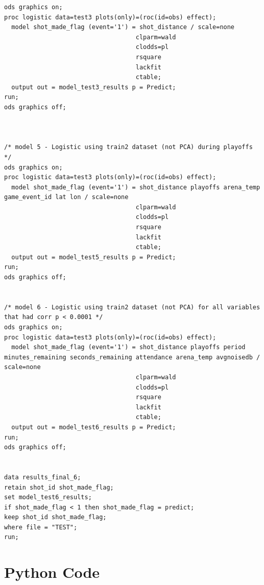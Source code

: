 \begin{verbatim}
ods graphics on;
proc logistic data=test3 plots(only)=(roc(id=obs) effect);
  model shot_made_flag (event='1') = shot_distance / scale=none
                            		clparm=wald
                            		clodds=pl
                            		rsquare
									lackfit
									ctable;
  output out = model_test3_results p = Predict;
run;
ods graphics off;



/* model 5 - Logistic using train2 dataset (not PCA) during playoffs */
ods graphics on;
proc logistic data=test3 plots(only)=(roc(id=obs) effect);
  model shot_made_flag (event='1') = shot_distance playoffs arena_temp game_event_id lat lon / scale=none
                            		clparm=wald
                            		clodds=pl
                            		rsquare
									lackfit
									ctable;
  output out = model_test5_results p = Predict;
run;
ods graphics off;


/* model 6 - Logistic using train2 dataset (not PCA) for all variables that had corr p < 0.0001 */
ods graphics on;
proc logistic data=test3 plots(only)=(roc(id=obs) effect);
  model shot_made_flag (event='1') = shot_distance playoffs period minutes_remaining seconds_remaining attendance arena_temp avgnoisedb / scale=none
                            		clparm=wald
                            		clodds=pl
                            		rsquare
									lackfit
									ctable;
  output out = model_test6_results p = Predict;
run;
ods graphics off;


data results_final_6;
retain shot_id shot_made_flag;
set model_test6_results;
if shot_made_flag < 1 then shot_made_flag = predict;
keep shot_id shot_made_flag;
where file = "TEST";
run;

\end{verbatim}

\section{Python Code}\label{pythoncode}


